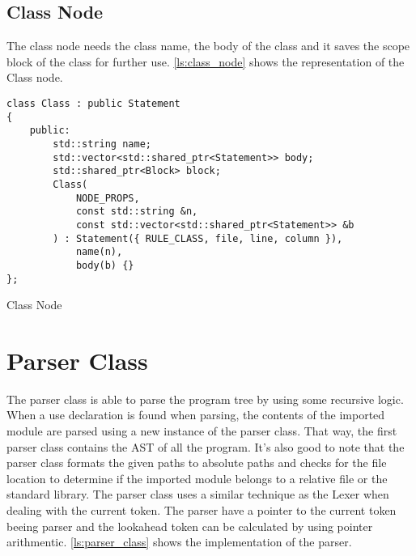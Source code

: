 \subsection{Class Node}

The class node needs the class name, the body of the class and it saves the scope block of the class for further use.
\autoref{ls:class_node} shows the representation of the Class node.

\begin{listing}[H]
\begin{verbatim}
class Class : public Statement
{
    public:
        std::string name;
        std::vector<std::shared_ptr<Statement>> body;
        std::shared_ptr<Block> block;
        Class(
            NODE_PROPS,
            const std::string &n,
            const std::vector<std::shared_ptr<Statement>> &b
        ) : Statement({ RULE_CLASS, file, line, column }),
            name(n),
            body(b) {}
};
\end{verbatim}
\caption{Class Node}
\label{ls:class_node}
\end{listing}

\section{Parser Class}

The parser class is able to parse the program tree by using some recursive logic. When a use declaration is found when parsing,
the contents of the imported module are parsed using a new instance of the parser class. That way, the first parser class contains
the AST of all the program. It's also good to note that the parser class formats the given paths to absolute paths and checks for the
file location to determine if the imported module belongs to a relative file or the standard library. The parser class uses a similar technique
as the Lexer when dealing with the current token. The parser have a pointer to the current token beeing parser and the lookahead token can be
calculated by using pointer arithmentic. \autoref{ls:parser_class} shows the implementation of the parser.

